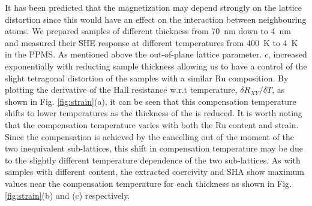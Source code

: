 \documentclass[reprint,aip,apl,floatfix,linenumbers,superscriptaddress]{revtex4-1}
\begin{document}
It has been predicted that the magnetization may depend strongly on the 
lattice distortion since this would have an effect on the interaction between 
neighbouring  atoms. We prepared  samples of different thickness 
from \SI{70}{\nano\metre} down to \SI{4}{\nano\metre} and measured their SHE 
response at different temperatures from \SI{400}{\kelvin} to \SI{4}{\kelvin} 
in the PPMS. As mentioned above the out-of-plane lattice parameter. $c$, 
increased exponentially with reducting sample thickness allowing us to have a 
control of the slight tetragonal distortion of the samples with a similar Ru 
composition. 
By plotting the derivative of the Hall resistance w.r.t temperature, $\delta R_{
XY}/\delta T$, as shown in Fig. \ref{fig:strain}(a), it can be seen that this 
compensation temperature shifts to lower temperatures as the thickness of the 
 is reduced. It is worth noting that the compensation temperature 
varies with both the Ru content and strain. Since the compensation is 
achieved by the cancelling out of the moment of the two inequivalent  
sub-lattices, this shift in compensation temperature may be due to the 
slightly different temperature dependence of the two sub-lattices. As with 
samples with different  content, the extracted coercivity and SHA show 
maximum values near the compensation temperature for each thickness as shown 
in Fig. \ref{fig:strain}(b) and (c) respectively.
\end{document}
